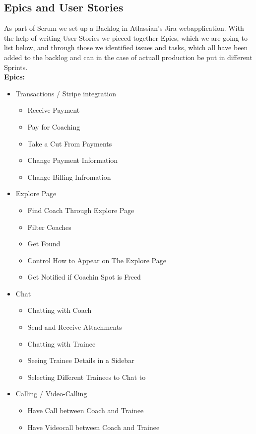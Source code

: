 \subsection{Epics and User Stories}
As part of Scrum we set up a Backlog in Atlassian's Jira webapplication. With the help of writing User Stories we pieced together Epics, which we are going to list below, and through those we identified issues and tasks, which all have been added to the backlog and can in the case of actuall production be put in different Sprints. \\
\textbf{Epics:}
\begin{itemize}

    \item Transactions / Stripe integration
    \begin{itemize}
        \item Receive Payment
        \item Pay for Coaching
        \item Take a Cut From Payments
        \item Change Payment Information
        \item Change Billing Infromation
    \end{itemize}

    \item Explore Page
    \begin{itemize}
        \item Find Coach Through Explore Page
        \item Filter Coaches
        \item Get Found
        \item Control How to Appear on The Explore Page
        \item Get Notified if Coachin Spot is Freed
    \end{itemize}

    \item Chat
    \begin{itemize}
        \item Chatting with Coach
        \item Send and Receive Attachments
        \item Chatting with Trainee
        \item Seeing Trainee Details in a Sidebar
        \item Selecting Different Trainees to Chat to
    \end{itemize}

    \item Calling / Video-Calling
    \begin{itemize}
        \item Have Call between Coach and Trainee
        \item Have Videocall between Coach and Trainee
    \end{itemize}


\end{itemize}
